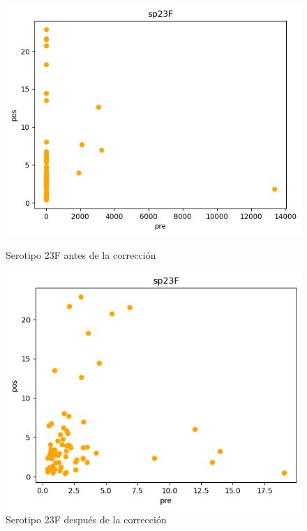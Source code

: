 \begin{figure}[h]
    \centering
    \begin{minipage}{0.45\textwidth}
        \centering
        \includegraphics[width=\linewidth]{Graphics/sp23fd.png}
        \caption{Serotipo 23F antes de la corrección}
        \label{fig:sp23fd}
    \end{minipage}%
    \hfill
    \begin{minipage}{0.45\textwidth}
        \centering
        \includegraphics[width=\linewidth]{Graphics/sp23fc.png}
        \caption{Serotipo 23F después de la corrección}
        \label{fig:sp23f}
    \end{minipage}

\end{figure}

